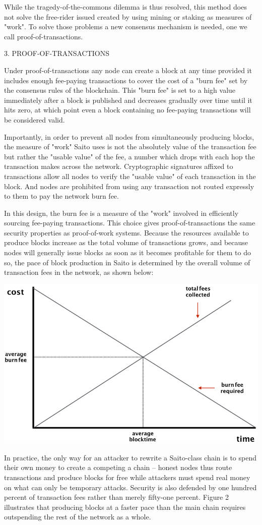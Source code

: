 \documentclass[11.5pt, oneside]{article}   	%
\begin{document}
\begin{multicols}{2}
While the tragedy-of-the-commons dilemma is thus resolved, this method does not solve the free-rider issued created by using mining or staking as measures of "work". To solve those problems a new consensus mechanism is needed, one we call proof-of-transactions.

3. PROOF-OF-TRANSACTIONS

Under proof-of-transactions any node can create a block at any time provided it includes enough fee-paying transactions to cover the cost of a "burn fee" set by the consensus rules of the blockchain. This "burn fee" is set to a high value immediately after a block is published and decreases gradually over time until it hits zero, at which point even a block containing no fee-paying transactions will be considered valid.

Importantly, in order to prevent all nodes from simultaneously producing blocks, the measure of "work" Saito uses is not the absolutely value of the transaction fee but rather the "usable value" of the fee, a number which drops with each hop the transaction makes across the network. Cryptographic signatures affixed to transactions allow all nodes to verify the "usable value" of each transaction in the block. And nodes are prohibited from using any transaction not routed expressly to them to pay the network burn fee.

In this design, the burn fee is a measure of the "work" involved in efficiently sourcing fee-paying transactions. This choice gives proof-of-transactions the same security properties as proof-of-work systems. Because the resources available to produce blocks increase as the total volume of transactions grows, and because nodes will generally issue blocks as soon as it becomes profitable for them to do so, the pace of block production in Saito is determined by the overall volume of transaction fees in the network, as shown below:

\includegraphics[width=.45\textwidth]{saito2.jpeg}

In practice, the only way for an attacker to rewrite a Saito-class chain is to spend their own money to create a competing a chain -- honest nodes thus route transactions and produce blocks for free while attackers must spend real money on what can only be temporary attacks. Security is also defended by one hundred percent of transaction fees rather than merely fifty-one percent. Figure 2 illustrates that producing blocks at a faster pace than the main chain requires outspending the rest of the network as a whole.


\end{multicols}
\end{document}
